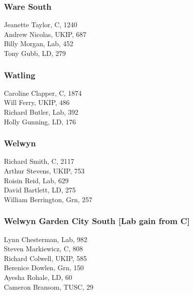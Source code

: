 \documentclass[a4paper,openany,10pt]{book}
\begin{document}
\subsubsection*{Ware South}



Jeanette Taylor, C, 1240\\
Andrew Nicolas, UKIP, 687\\
Billy Morgan, Lab, 452\\
Tony Gubb, LD, 279\\


\subsubsection*{Watling}



Caroline Clapper, C, 1874\\
Will Ferry, UKIP, 486\\
Richard Butler, Lab, 392\\
Holly Gunning, LD, 176\\


\subsubsection*{Welwyn}



Richard Smith, C, 2117\\
Arthur Stevens, UKIP, 753\\
Roisin Reid, Lab, 629\\
David Bartlett, LD, 275\\
William Berrington, Grn, 257\\


\subsubsection*{Welwyn Garden City South \hspace*{\fill}\nolinebreak[1]%
\enspace\hspace*{\fill}
[Lab gain from C]}



Lynn Chesterman, Lab, 982\\
Steven Markiewicz, C, 808\\
Richard Colwell, UKIP, 585\\
Berenice Dowlen, Grn, 150\\
Ayesha Rohale, LD, 60\\
Cameron Bransom, TUSC, 29\\
\end{document}
